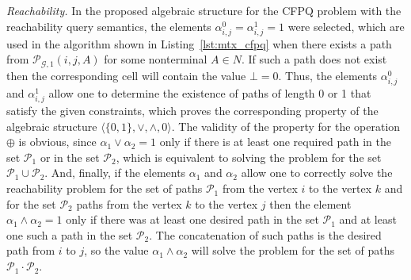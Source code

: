 \textit{Reachability.} %
In the proposed algebraic structure for the CFPQ problem with the reachability query semantics, the elements $\alpha^0_{i, j} = \alpha^1_{i, j} = 1$ were selected, which are used in the algorithm shown in Listing~\ref{lst:mtx_cfpq} when there exists a path from $\mathcal{P}_{\mathcal{G}, 1}(i, j, A)$ for some nonterminal $A \in N$. If such a path does not exist then the corresponding cell will contain the value $\bot = 0$. Thus, the elements $\alpha^0_{i, j}$ and $\alpha^1_{i, j}$ allow one to determine the existence of paths of length 0 or 1 that satisfy the given constraints, which proves the corresponding property of the algebraic structure $\langle \{0, 1\}, \vee, \wedge, 0 \rangle$. The validity of the property for the operation $\oplus$ is obvious, since $\alpha_1 \vee \alpha_2 = 1$ only if there is at least one required path in the set $\mathcal{P}_1$ or in the set $\mathcal{P}_2$, which is equivalent to solving the problem for the set $\mathcal{P}_1 \cup \mathcal{P}_2$. And, finally, if the elements $\alpha_1$ and $\alpha_2$ allow one to correctly solve the reachability problem for the set of paths $\mathcal{P}_1$ from the vertex $i$ to the vertex $k$ and for the set $\mathcal{P}_2$ paths from the vertex $k$ to the vertex $j$ then the element $\alpha_1 \wedge \alpha_2 = 1$ only if there was at least one desired path in the set $\mathcal{P}_1$ and at least one such a path in the set $\mathcal{P}_2$. The concatenation of such paths is the desired path from $i$ to $j$, so the value $\alpha_1 \wedge \alpha_2$ will solve the problem for the set of paths $\mathcal{P}_1 \cdot \mathcal{P}_2$.

